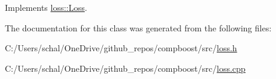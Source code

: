 Implements \mbox{\hyperlink{classloss_1_1_loss_ae9f94dd9b8311397583ba3a9cb485e94}{loss\+::\+Loss}}.



The documentation for this class was generated from the following files\+:\begin{DoxyCompactItemize}
\item 
C\+:/\+Users/schal/\+One\+Drive/github\+\_\+repos/compboost/src/\mbox{\hyperlink{loss_8h}{loss.\+h}}\item 
C\+:/\+Users/schal/\+One\+Drive/github\+\_\+repos/compboost/src/\mbox{\hyperlink{loss_8cpp}{loss.\+cpp}}\end{DoxyCompactItemize}
